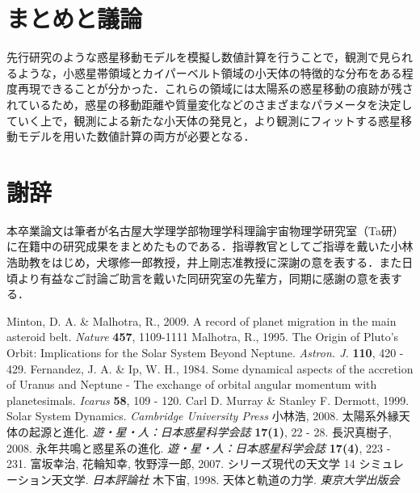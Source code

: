 \documentclass[11pt,a4paper,oneside,onecolumn]{jreport}
\begin{document}
\section{まとめと議論}
先行研究のような惑星移動モデルを模擬し数値計算を行うことで，観測で見られるような，小惑星帯領域とカイパーベルト領域の小天体の特徴的な分布をある程度再現できることが分かった．これらの領域には太陽系の惑星移動の痕跡が残されているため，惑星の移動距離や質量変化などのさまざまなパラメータを決定していく上で，観測による新たな小天体の発見と，より観測にフィットする惑星移動モデルを用いた数値計算の両方が必要となる．


\section*{謝辞}
本卒業論文は筆者が名古屋大学理学部物理学科理論宇宙物理学研究室（Ta研）に在籍中の研究成果をまとめたものである．指導教官としてご指導を戴いた小林浩助教をはじめ，犬塚修一郎教授，井上剛志准教授に深謝の意を表する．また日頃より有益なご討論ご助言を戴いた同研究室の先輩方，同期に感謝の意を表する．


\begin{thebibliography}{9}
   Minton, D. A. \& Malhotra, R., 2009. A record of planet migration in the main asteroid belt. {\it Nature} {\bf 457}, 1109-1111
   Malhotra, R., 1995. The Origin of Pluto's Orbit: Implications for the Solar System Beyond Neptune. {\it Astron. J.} {\bf 110}, 420 - 429.
   Fernandez, J. A. \& Ip, W. H., 1984. Some dynamical aspects of the accretion of Uranus and Neptune - The exchange of orbital angular momentum with planetesimals. {\it Icarus} {\bf 58}, 109 - 120.
   Carl D. Murray \& Stanley F. Dermott, 1999. Solar System Dynamics. {\it Cambridge University Press}
   小林浩, 2008. 太陽系外縁天体の起源と進化. {\it 遊・星・人：日本惑星科学会誌} {\bf 17(1)}, 22 - 28.
   長沢真樹子, 2008. 永年共鳴と惑星系の進化. {\it 遊・星・人：日本惑星科学会誌} {\bf 17(4)}, 223 - 231.  
   富坂幸治, 花輪知幸, 牧野淳一郎, 2007. シリーズ現代の天文学 14 シミュレーション天文学. {\it 日本評論社}
   木下宙, 1998. 天体と軌道の力学. {\it 東京大学出版会}

  
\end{thebibliography}
\end{document}
